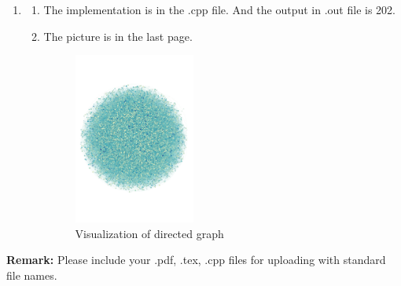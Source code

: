 \documentclass[12pt,a4paper]{article}
\makeatletter
\newtheorem*{solution}{Solution}
\theoremstyle{definition}
\renewenvironment{solution}[1][Solution] {\par\pushQED{\qed}\normalfont\topsep6\p@\@plus6\p@\relax\trivlist\item[\hskip\labelsep\bfseries#1\@addpunct{.}]\ignorespaces}{\popQED\endtrivlist\@endpefalse} \makeatother
\makeatother
\begin{document}
\begin{enumerate}
    \begin{solution}
        \begin{enumerate}
            \item The implementation is in the .cpp file. And the output in .out file is 202.
            \item The picture is in the last page.
            \begin{figure}[htbp]
                \centering
                \includegraphics[width=0.4\textwidth]{SCC.pdf}
                \caption{Visualization of directed graph}\label{SCC}
            \end{figure}

        \end{enumerate}
    \end{solution}

\end{enumerate}



\textbf{Remark:} Please include your .pdf, .tex, .cpp files for uploading with standard file names.
\newpage


\end{document}
